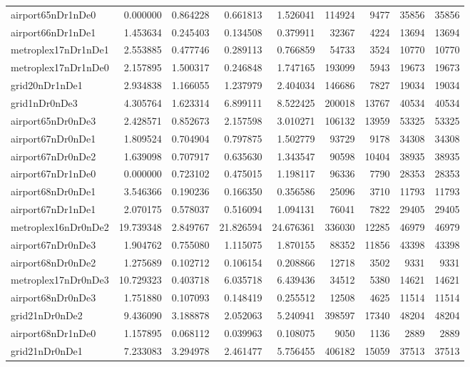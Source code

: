 \begin{longtable}{|l|r|r|r|r|r|r|r|r|}
airport65nDr1nDe0 & 0.000000 & 0.864228 & 0.661813 & 1.526041 & 114924 & 9477 & 35856 & 35856 \\
airport66nDr1nDe1 & 1.453634 & 0.245403 & 0.134508 & 0.379911 & 32367 & 4224 & 13694 & 13694 \\
metroplex17nDr1nDe1 & 2.553885 & 0.477746 & 0.289113 & 0.766859 & 54733 & 3524 & 10770 & 10770 \\
metroplex17nDr1nDe0 & 2.157895 & 1.500317 & 0.246848 & 1.747165 & 193099 & 5943 & 19673 & 19673 \\
grid20nDr1nDe1 & 2.934838 & 1.166055 & 1.237979 & 2.404034 & 146686 & 7827 & 19034 & 19034 \\
grid1nDr0nDe3 & 4.305764 & 1.623314 & 6.899111 & 8.522425 & 200018 & 13767 & 40534 & 40534 \\
airport65nDr0nDe3 & 2.428571 & 0.852673 & 2.157598 & 3.010271 & 106132 & 13959 & 53325 & 53325 \\
airport67nDr0nDe1 & 1.809524 & 0.704904 & 0.797875 & 1.502779 & 93729 & 9178 & 34308 & 34308 \\
airport67nDr0nDe2 & 1.639098 & 0.707917 & 0.635630 & 1.343547 & 90598 & 10404 & 38935 & 38935 \\
airport67nDr1nDe0 & 0.000000 & 0.723102 & 0.475015 & 1.198117 & 96336 & 7790 & 28353 & 28353 \\
airport68nDr0nDe1 & 3.546366 & 0.190236 & 0.166350 & 0.356586 & 25096 & 3710 & 11793 & 11793 \\
airport67nDr1nDe1 & 2.070175 & 0.578037 & 0.516094 & 1.094131 & 76041 & 7822 & 29405 & 29405 \\
metroplex16nDr0nDe2 & 19.739348 & 2.849767 & 21.826594 & 24.676361 & 336030 & 12285 & 46979 & 46979 \\
airport67nDr0nDe3 & 1.904762 & 0.755080 & 1.115075 & 1.870155 & 88352 & 11856 & 43398 & 43398 \\
airport68nDr0nDe2 & 1.275689 & 0.102712 & 0.106154 & 0.208866 & 12718 & 3502 & 9331 & 9331 \\
metroplex17nDr0nDe3 & 10.729323 & 0.403718 & 6.035718 & 6.439436 & 34512 & 5380 & 14621 & 14621 \\
airport68nDr0nDe3 & 1.751880 & 0.107093 & 0.148419 & 0.255512 & 12508 & 4625 & 11514 & 11514 \\
grid21nDr0nDe2 & 9.436090 & 3.188878 & 2.052063 & 5.240941 & 398597 & 17340 & 48204 & 48204 \\
airport68nDr1nDe0 & 1.157895 & 0.068112 & 0.039963 & 0.108075 & 9050 & 1136 & 2889 & 2889 \\
grid21nDr0nDe1 & 7.233083 & 3.294978 & 2.461477 & 5.756455 & 406182 & 15059 & 37513 & 37513 \\

\end{longtable}
